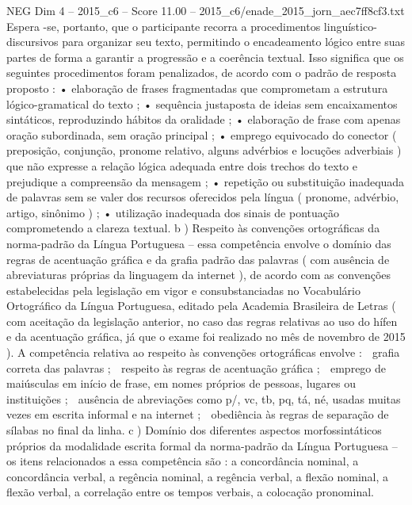 \begin{textsample}{NEG Dim 4 – 2015\_c6 – Score 11.00 – 2015\_c6/enade\_2015\_jorn\_aec7ff8cf3.txt}
Espera -se, portanto, que o participante recorra a procedimentos linguístico-discursivos para organizar seu texto, permitindo o encadeamento lógico entre suas partes de forma a garantir a progressão e a coerência textual.
Isso significa que os seguintes procedimentos foram penalizados, de acordo com o padrão de resposta proposto : • elaboração de frases fragmentadas que comprometam a estrutura lógico-gramatical do texto ; • sequência justaposta de ideias sem encaixamentos sintáticos, reproduzindo hábitos da oralidade ; • elaboração de frase com apenas oração subordinada, sem oração principal ; • emprego equivocado do conector ( preposição, conjunção, pronome relativo, alguns advérbios e locuções adverbiais ) que não expresse a relação lógica adequada entre dois trechos do texto e prejudique a compreensão da mensagem ; • repetição ou substituição inadequada de palavras sem se valer dos recursos oferecidos pela língua ( pronome, advérbio, artigo, sinônimo ) ; • utilização inadequada dos sinais de pontuação comprometendo a clareza textual. b ) Respeito às convenções ortográficas da norma-padrão da Língua Portuguesa – essa competência envolve o domínio das regras de acentuação gráfica e da grafia padrão das palavras ( com ausência de abreviaturas próprias da linguagem da internet ), de acordo com as convenções estabelecidas pela legislação em vigor e consubstanciadas no Vocabulário Ortográfico da Língua Portuguesa, editado pela Academia Brasileira de Letras ( com aceitação da legislação anterior, no caso das regras relativas ao uso do hífen e da acentuação gráfica, já que o exame foi realizado no mês de novembro de 2015 ).
A competência relativa ao respeito às convenções ortográficas envolve :  grafia correta das palavras ;  respeito às regras de acentuação gráfica ;  emprego de maiúsculas em início de frase, em nomes próprios de pessoas, lugares ou instituições ;  ausência de abreviações como p/, vc, tb, pq, tá, né, usadas muitas vezes em escrita informal e na internet ;  obediência às regras de separação de sílabas no final da linha. c ) Domínio dos diferentes aspectos morfossintáticos próprios da modalidade escrita formal da norma-padrão da Língua Portuguesa – os itens relacionados a essa competência são : a concordância nominal, a concordância verbal, a regência nominal, a regência verbal, a flexão nominal, a flexão verbal, a correlação entre os tempos verbais, a colocação pronominal.

\end{textsample}
